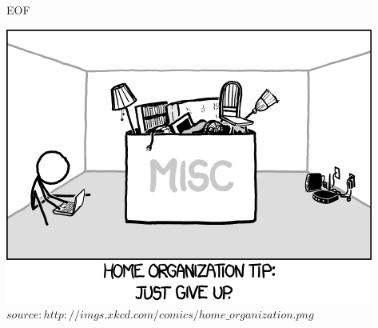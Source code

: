 		
	\begin{frame} {EOF}
		\begin{center}
			\includegraphics[scale=0.5]{graphics/eof5.png}\\
			\tiny $source: http://imgs.xkcd.com/comics/home\_organization.png$
		\end{center}
	\end{frame}


